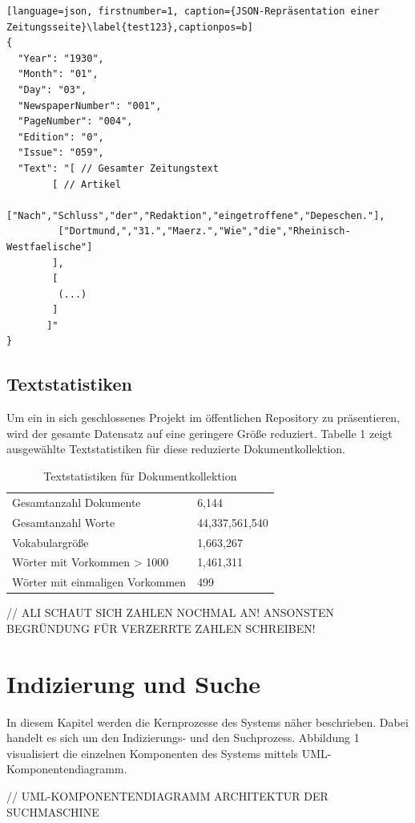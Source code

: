 \documentclass[11pt,a4paper, halfparskip]{scrartcl}
\begin{document}
\break

\begin{lstlisting}[language=json, firstnumber=1, caption={JSON-Repräsentation einer Zeitungsseite}\label{test123},captionpos=b]
{
  "Year": "1930",
  "Month": "01",
  "Day": "03",
  "NewspaperNumber": "001",
  "PageNumber": "004",
  "Edition": "0",
  "Issue": "059",
  "Text": "[ // Gesamter Zeitungstext
	    [ // Artikel
	     ["Nach","Schluss","der","Redaktion","eingetroffene","Depeschen."], 
	     ["Dortmund,","31.","Maerz.","Wie","die","Rheinisch-Westfaelische"] 
	    ],
	    [
	     (...)
	    ] 
	   ]"
}
\end{lstlisting}

\subsection{Textstatistiken}
Um ein in sich geschlossenes Projekt im öffentlichen Repository zu präsentieren, wird der gesamte Datensatz auf eine geringere Größe reduziert.
Tabelle 1 zeigt ausgewählte Textstatistiken für diese reduzierte Dokumentkollektion.

\begin{table}[h!]
	\centering
	\begin{tabularx}{0.8\textwidth}{lX}
		\hline
		Gesamtanzahl Dokumente & 6,144\\
		Gesamtanzahl Worte & 44,337,561,540 \\
		Vokabulargröße & 1,663,267 \\
		Wörter mit Vorkommen > 1000 & 1,461,311 \\
		Wörter mit einmaligen Vorkommen & 499 \\
		\hline
	\end{tabularx}
	\caption{Textstatistiken für Dokumentkollektion}
\end{table}

// ALI SCHAUT SICH ZAHLEN NOCHMAL AN! ANSONSTEN BEGRÜNDUNG FÜR VERZERRTE ZAHLEN SCHREIBEN!

\section{Indizierung und Suche}

In diesem Kapitel werden die Kernprozesse des Systems näher beschrieben. 
Dabei handelt es sich um den Indizierungs- und den Suchprozess.
Abbildung 1 visualisiert die einzelnen Komponenten des Systems mittels UML-Komponentendiagramm. 

// UML-KOMPONENTENDIAGRAMM ARCHITEKTUR DER SUCHMASCHINE 
\end{document}
